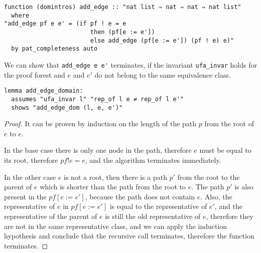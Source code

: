 \begin{lstlisting}
function (domintros) add_edge :: "nat list ⇒ nat ⇒ nat ⇒ nat list"
  where
"add_edge pf e e' = (if pf ! e = e
                        then (pf[e := e'])
                        else add_edge (pf[e := e']) (pf ! e) e)"
  by pat_completeness auto
\end{lstlisting}

We can show that \lstinline{add_edge e e'} terminates, if the invariant \lstinline{ufa_invar} holds for the proof forest and $e$ and $e'$ do not belong to the same equivalence class.

\begin{lstlisting}
lemma add_edge_domain:
  assumes "ufa_invar l" "rep_of l e ≠ rep_of l e'"
  shows "add_edge_dom (l, e, e')"
\end{lstlisting}

\begin{proof}
It can be proven by induction on the length of the path $p$ from the root of $e$ to $e$.

In the base case there is only one node in the path, therefore $e$ must be equal to its root, therefore $pf ! e = e$, and the algorithm terminates immediately.

In the other case $e$ is not a root, then there is a path $p'$ from the root to the parent of $e$ which is shorter than the path from the root to $e$. The path $p'$ is also present in the $pf[e := e']$, because the path does not contain $e$. Also, the representative of $e$ in $pf[e := e']$ is equal to the representative of $e'$, and the representative of the parent of $e$ is still the old representative of $e$, therefore they are not in the same representative class, and we can apply the induction hypothesis and conclude that the recursive call terminates, therefore the function terminates.
\end{proof}





